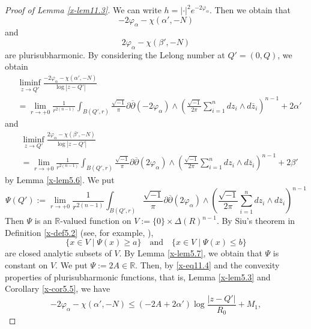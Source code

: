 \documentclass[12pt,twoside]{amsart}
\theoremstyle{definition}
\begin{document}
\begin{proof}[Proof of Lemma \ref{x-lem11.3}]
We can write $h=|\cdot |^2 e^{-2\varphi_\alpha}$. 
Then we obtain that 
\begin{equation}\label{x-eq11.2}
-2\varphi_\alpha -\chi (\alpha', -N)
\end{equation} 
and 
\begin{equation}\label{x-eq11.3}
2\varphi_\alpha -\chi (\beta', -N)
\end{equation}  
are plurisubharmonic. 
By considering the Lelong number at $Q'=(0, Q)$, we obtain 
\begin{equation}\label{x-eq11.4}
\begin{split}
&\liminf_{z\to Q'} \frac{-2\varphi_\alpha-\chi(\alpha', -N)}{\log |z-Q'|} 
\\ &=
\lim_{r\to +0} 
\frac{1}{r^{2(n-1)}} 
\int _{B(Q', r)} \frac{\sqrt{-1}}{\pi} \partial \overline \partial (-2\varphi_\alpha) 
\wedge \left(\frac{\sqrt{-1}}{2\pi} \sum _{i=1}^n dz_i \wedge d \overline z_i
\right)^{n-1}+2\alpha'
\end{split}
\end{equation}
and 
\begin{equation}\label{x-eq11.5}
\begin{split}
&\liminf_{z\to Q'} \frac{2\varphi_\alpha-\chi(\beta', -N)}{\log |z-Q'|} \\ &=
\lim_{r\to +0} 
\frac{1}{r^{2(n-1)}} 
\int _{B(Q', r)} \frac{\sqrt{-1}}{\pi} \partial \overline \partial (2\varphi_\alpha) 
\wedge \left(\frac{\sqrt{-1}}{2\pi} \sum _{i=1}^n dz_i \wedge d \overline z_i
\right)^{n-1} +2\beta' 
\end{split} 
\end{equation} 
by Lemma \ref{x-lem5.6}. We put 
\[
\Psi (Q'):= \lim_{r\to +0} 
\frac{1}{r^{2(n-1)}} 
\int _{B(Q', r)} \frac{\sqrt{-1}}{\pi} \partial \overline \partial (2\varphi_\alpha) 
\wedge \left(\frac{\sqrt{-1}}{2\pi} \sum _{i=1}^n dz_i \wedge d \overline z_i
\right)^{n-1}
\] 
Then $\Psi$ is an $\mathbb R$-valued function on $V:=\{0\}\times 
\Delta(R)^{n-1}$. 
By Siu's theorem in Definition \ref{x-def5.2} (see, for example, \cite[(13.3) Corollary]{demailly1}), 
\[
\{x\in V\mid \Psi (x)\geq a\} \quad \text{and} \quad 
\{x\in V\mid \Psi (x)\leq b\} 
\] 
are closed analytic subsets of $V$. 
By Lemma \ref{x-lem5.7}, we obtain that 
$\Psi$ is constant on $V$. We put $\Psi :=2A\in \mathbb R$.  
Then, by \eqref{x-eq11.4} and the convexity properties of 
plurisubharmonic functions, that is, Lemma \ref{x-lem5.3} and 
Corollary \ref{x-cor5.5}, we have 
\begin{equation}\label{x-eq11.6}
-2\varphi_\alpha -\chi (\alpha', -N) \leq (-2A+2\alpha') \log \frac{|z-Q'|}{R_0} +M_1, 

\end{equation}
\end{proof}
\end{document}
